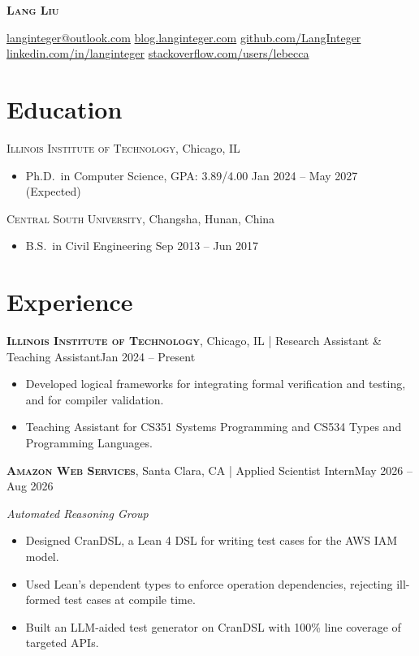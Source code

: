 \documentclass[11pt,letterpaper]{article}
\newcommand{\sqbullet}{\raisebox{0.3ex}{\scalebox{0.45}{$\blacksquare$}}}
\newcommand{\sep}{\enspace\sqbullet\enspace}
\newcommand{\edu}[3]{%
  #1\par
  \begin{itemize}\item #2 \hfill #3\end{itemize}}
\newcommand{\job}[4]{%
  \textbf{\textsc{#1}}, #2 | #3\hfill #4\par}
\newcommand{\jobnote}[1]{\textit{#1}\par}
\begin{document}
{\fontsize{30}{32}\selectfont\bfseries\scshape Lang Liu}\par\vspace{0.3ex}
{\footnotesize\href{mailto:langinteger@outlook.com}{langinteger@outlook.com}\sep
\href{https://blog.langinteger.com}{blog.langinteger.com}\sep
\href{https://github.com/LangInteger}{github.com/LangInteger}\sep
\href{https://www.linkedin.com/in/langinteger}{linkedin.com/in/langinteger}\sep
\href{https://stackoverflow.com/users/lebecca}{stackoverflow.com/users/lebecca}\par}

\section{Education}
\edu{\textsc{Illinois Institute of Technology}, Chicago, IL}
    {Ph.D.\ in Computer Science, GPA: 3.89/4.00}{Jan 2024 -- May 2027 (Expected)}
\edu{\textsc{Central South University}, Changsha, Hunan, China}
    {B.S.\ in Civil Engineering}{Sep 2013 -- Jun 2017}

\section{Experience}
\job{Illinois Institute of Technology}{Chicago, IL}{Research Assistant \& Teaching Assistant}{Jan 2024 -- Present}
\begin{itemize}
  \item Developed logical frameworks for integrating formal verification and testing, and for compiler validation.
  \item Teaching Assistant for CS351 Systems Programming and CS534 Types and Programming Languages.
\end{itemize}

\job{Amazon Web Services}{Santa Clara, CA}{Applied Scientist Intern}{May 2026 -- Aug 2026}
\jobnote{Automated Reasoning Group}
\begin{itemize}
  \item Designed CranDSL, a Lean 4 DSL for writing test cases for the AWS IAM model.
  \item Used Lean's dependent types to enforce operation dependencies, rejecting ill-formed test cases at compile time.
  \item Built an LLM-aided test generator on CranDSL with 100\% line coverage of targeted APIs.
\end{itemize}
\end{document}
